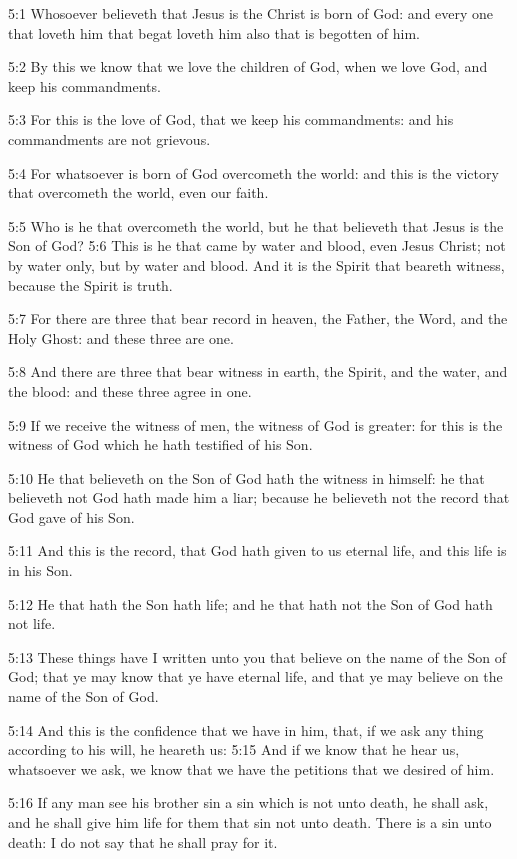 5:1 Whosoever believeth that Jesus is the Christ is born of God: and every one that loveth him that begat loveth him also that is begotten of him.

5:2 By this we know that we love the children of God, when we love God, and keep his commandments.

5:3 For this is the love of God, that we keep his commandments: and his commandments are not grievous.

5:4 For whatsoever is born of God overcometh the world: and this is the victory that overcometh the world, even our faith.

5:5 Who is he that overcometh the world, but he that believeth that Jesus is the Son of God?  5:6 This is he that came by water and blood, even Jesus Christ; not by water only, but by water and blood. And it is the Spirit that beareth witness, because the Spirit is truth.

5:7 For there are three that bear record in heaven, the Father, the Word, and the Holy Ghost: and these three are one.

5:8 And there are three that bear witness in earth, the Spirit, and the water, and the blood: and these three agree in one.

5:9 If we receive the witness of men, the witness of God is greater: for this is the witness of God which he hath testified of his Son.

5:10 He that believeth on the Son of God hath the witness in himself: he that believeth not God hath made him a liar; because he believeth not the record that God gave of his Son.

5:11 And this is the record, that God hath given to us eternal life, and this life is in his Son.

5:12 He that hath the Son hath life; and he that hath not the Son of God hath not life.

5:13 These things have I written unto you that believe on the name of the Son of God; that ye may know that ye have eternal life, and that ye may believe on the name of the Son of God.

5:14 And this is the confidence that we have in him, that, if we ask any thing according to his will, he heareth us: 5:15 And if we know that he hear us, whatsoever we ask, we know that we have the petitions that we desired of him.

5:16 If any man see his brother sin a sin which is not unto death, he shall ask, and he shall give him life for them that sin not unto death. There is a sin unto death: I do not say that he shall pray for it.

